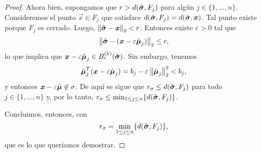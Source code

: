 \begin{proof}
	Ahora bien, supongamos que $r > d(\hat{\boldsymbol{ \sigma }}, F_j)$ para algún $j \in \lbrace 1, \ldots,
	n \rbrace$. Consideremos el punto $\vec{x} \in F_j$ que satisface $d(\hat{\boldsymbol{ \sigma }}, F_j) =
	d(\hat{\boldsymbol{ \sigma }}, \boldsymbol{x})$. Tal punto existe porque $F_j$ es cerrado. Luego,
	$\left\lVert \hat{\boldsymbol{ \sigma }} - \boldsymbol{x} \right\rVert_2 < r$. Entonces existe $\varepsilon > 0$ tal que
	\begin{equation*}
		\left\lVert \hat{\boldsymbol{ \sigma }} - (\boldsymbol{x} - \varepsilon\hat{\boldsymbol{ \mu }}_j) \right\rVert_2 \leq r,
	\end{equation*}
	lo que implica que $\boldsymbol{x} - \varepsilon\hat{\boldsymbol{ \mu }}_j \in
	B_r^{(k)}(\hat{\boldsymbol{ \sigma }})$. Sin embargo, tenemos
	\begin{equation*}
		\hat{\boldsymbol{ \mu }}_j^T(\boldsymbol{x} - \varepsilon\hat{\boldsymbol{ \mu }}_j) = b_j - \varepsilon\left\lVert \hat{\boldsymbol{ \mu }}_j \right\rVert_2^2 < b_j,
	\end{equation*}
	y entonces $\boldsymbol{x} - \varepsilon\hat{\boldsymbol{ \mu }} \not\in \sigma$. De aquí se sigue que $r_\sigma
	\leq d(\hat{\boldsymbol{ \sigma }}, F_j)$ para todo $j \in \lbrace 1, \ldots, n \rbrace$ y, por lo tanto,
	$r_\sigma \leq \min_{1 \leq j \leq n} \lbrace d(\hat{\boldsymbol{ \sigma }}, F_j) \rbrace$.

	Concluimos, entonces, con
	\begin{equation*}
		r_\sigma = \min_{1 \leq j \leq n} \lbrace d(\hat{\boldsymbol{ \sigma }}, F_j) \rbrace,
	\end{equation*}
	que es lo que queríamos demostrar.
\end{proof}

